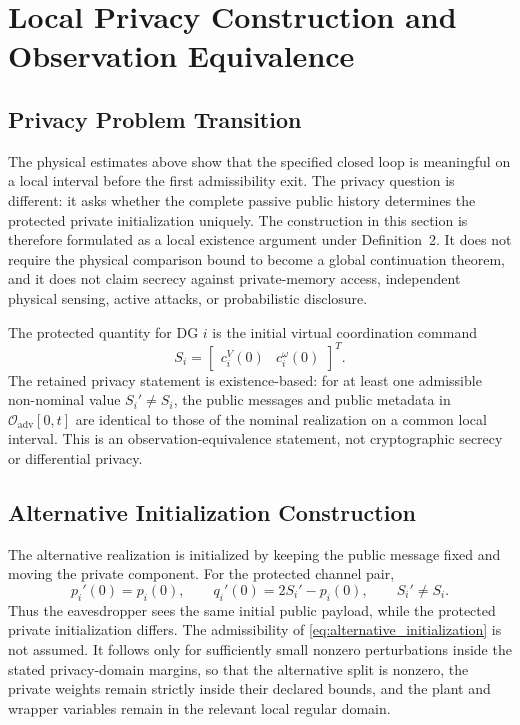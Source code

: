 \documentclass[journal]{IEEEtran}
\begin{document}
\section{Local Privacy Construction and Observation Equivalence}
\label{sec:privacy_construction}

\subsection{Privacy Problem Transition}

The physical estimates above show that the specified closed loop is meaningful
on a local interval before the first admissibility exit. The privacy question is
different: it asks whether the complete passive public history determines the
protected private initialization uniquely. The construction in this section is
therefore formulated as a local existence argument under Definition~2. It does
not require the physical comparison bound to become a global continuation
theorem, and it does not claim secrecy against private-memory access,
independent physical sensing, active attacks, or probabilistic disclosure.

The protected quantity for DG $i$ is the initial virtual coordination command
\begin{equation}
S_i=\begin{bmatrix}c_i^V(0)&c_i^\omega(0)\end{bmatrix}^{T}.
\label{eq:protected_initial_command}
\end{equation}
The retained privacy statement is existence-based: for at least one admissible
non-nominal value $S_i'\neq S_i$, the public messages and public metadata in
$\mathcal O_{\mathrm{adv}}[0,t]$ are identical to those of the nominal
realization on a common local interval. This is an observation-equivalence
statement, not cryptographic secrecy or differential privacy.

\subsection{Alternative Initialization Construction}

The alternative realization is initialized by keeping the public message fixed
and moving the private component. For the protected channel pair,
\begin{equation}
p_i'(0)=p_i(0),
\qquad
q_i'(0)=2S_i'-p_i(0),
\qquad
S_i'\neq S_i.
\label{eq:alternative_initialization}
\end{equation}
Thus the eavesdropper sees the same initial public payload, while the protected
private initialization differs. The admissibility of \eqref{eq:alternative_initialization}
is not assumed. It follows only for sufficiently small nonzero perturbations
inside the stated privacy-domain margins, so that the alternative split is
nonzero, the private weights remain strictly inside their declared bounds, and
the plant and wrapper variables remain in the relevant local regular domain.
\end{document}
